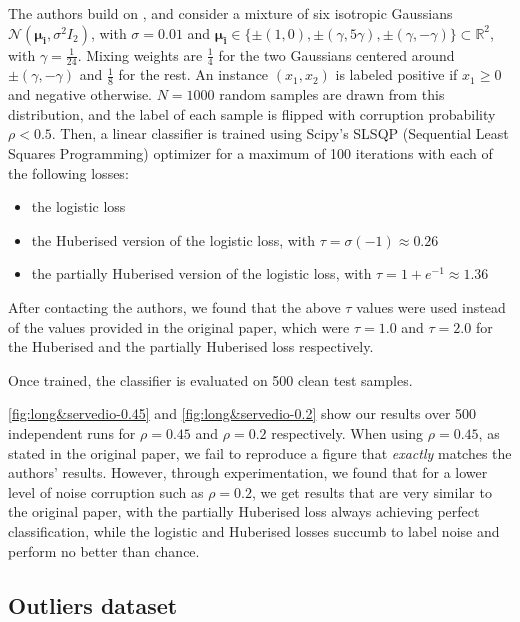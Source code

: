 The authors build on \citet{long_random_2010}, and consider a mixture of six isotropic Gaussians $\mathcal{N}(\boldsymbol{\mu_i}, \sigma^2 I_2)$, with $\sigma=0.01$ and $\boldsymbol{\mu_i} \in \{\pm(1,0), \pm(\gamma, 5\gamma), \pm(\gamma, -\gamma)\} \subset \mathbb{R}^2$, with $\gamma = \frac{1}{24}$.
Mixing weights are $\frac{1}{4}$ for the two Gaussians centered around $\pm(\gamma, -\gamma)$ and $\frac{1}{8}$ for the rest.
An instance $(x_1,x_2)$ is labeled positive if $x_1 \geq 0$ and negative otherwise.
$N = 1000$ random samples are drawn from this distribution, and the label of each sample is flipped with corruption probability $\rho < 0.5$.
Then, a linear classifier is trained using Scipy's SLSQP (Sequential Least Squares Programming) optimizer for a maximum of 100 iterations with each of the following losses:
\begin{itemize}
    \item the logistic loss
    \item the Huberised version of the logistic loss, with $\tau = \sigma(-1) \approx 0.26$
    \item the partially Huberised version of the logistic loss, with $\tau = 1 + e^{-1} \approx 1.36$
\end{itemize}
After contacting the authors, we found that the above $\tau$ values were used instead of the values provided in the original paper, which were $\tau = 1.0$ and $\tau = 2.0$ for the Huberised and the partially Huberised loss respectively.

Once trained, the classifier is evaluated on 500 clean test samples.


\autoref{fig:long&servedio-0.45} and \autoref{fig:long&servedio-0.2} show our results over 500 independent runs for $\rho = 0.45$ and $\rho = 0.2$ respectively.
When using $\rho=0.45$, as stated in the original paper, we fail to reproduce a figure that \emph{exactly} matches the authors' results.
However, through experimentation, we found that for a lower level of noise corruption such as $\rho = 0.2$, we get results that are very similar to the original paper, with the partially Huberised loss always achieving perfect classification, while the logistic and Huberised losses succumb to label noise and perform no better than chance.


\subsection{Outliers dataset}

